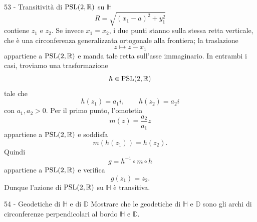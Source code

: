 \documentclass[a4paper]{article}
\begin{document}
\begin{snippetsolution}{53 - Transitività di
    \(\operatorname{PSL}(2,\mathbb{R})\) su \(\mathbb{H}\)}
    \[
        R=\sqrt{(x_1-a)^2+y_1^2}
    \]
    contiene \(z_1\) e \(z_2\). Se invece \(x_1=x_2\), i due punti stanno sulla stessa retta verticale, che è una circonferenza generalizzata ortogonale alla frontiera; la traslazione
    \[
        z\longmapsto z-x_1
    \]
    appartiene a \(\operatorname{PSL}(2,\mathbb{R})\) e manda tale retta sull'asse immaginario.
    In entrambi i casi, troviamo una trasformazione
    \[
        h\in\operatorname{PSL}(2,\mathbb{R})
    \]
    tale che
    \[
        h(z_1)=a_1i,
        \qquad
        h(z_2)=a_2i
    \]
    con \(a_1,a_2>0\). Per il primo punto, l'omotetia
    \[
        m(z)=\frac{a_2}{a_1}z
    \]
    appartiene a \(\operatorname{PSL}(2,\mathbb{R})\) e soddisfa
    \[
        m(h(z_1))=h(z_2).
    \]
    Quindi
    \[
        g=h^{-1}\circ m\circ h
    \]
    appartiene a \(\operatorname{PSL}(2,\mathbb{R})\) e verifica
    \[
        g(z_1)=z_2.
    \]
    Dunque l'azione di \(\operatorname{PSL}(2,\mathbb{R})\) su \(\mathbb{H}\) è transitiva.
\end{snippetsolution}

\begin{snippetexercise}{54 - Geodetiche di \(\mathbb{H}\) e di \(\mathbb{D}\)}
    Mostrare che le geodetiche di \(\mathbb{H}\) e \(\mathbb{D}\) sono gli archi di
    circonferenze perpendicolari al bordo \(\mathbb{H}\) e \(\mathbb{D}\).
\end{snippetexercise}
\end{document}
